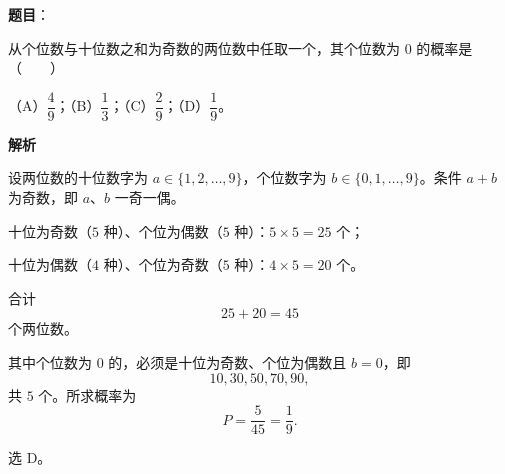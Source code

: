 \begin{answer}

\textbf{题目}：

从个位数与十位数之和为奇数的两位数中任取一个，其个位数为 $0$ 的概率是\mbox{（　　）}

（A）$\dfrac49$；（B）$\dfrac13$；（C）$\dfrac29$；（D）$\dfrac19$。

\textbf{解析}

设两位数的十位数字为 $a\in\{1,2,\ldots,9\}$，个位数字为 $b\in\{0,1,\ldots,9\}$。条件 $a+b$ 为奇数，即 $a$、$b$ 一奇一偶。

十位为奇数（$5$ 种）、个位为偶数（$5$ 种）：$5\times5=25$ 个；

十位为偶数（$4$ 种）、个位为奇数（$5$ 种）：$4\times5=20$ 个。

合计
\nopagebreak[4]
\[25+20=45\]
个两位数。

其中个位数为 $0$ 的，必须是十位为奇数、个位为偶数且 $b=0$，即
\nopagebreak[4]
\[10,30,50,70,90,\]
共 $5$ 个。所求概率为
\nopagebreak[4]
\[P=\frac5{45}=\frac19.\]

选 D。


\end{answer}
